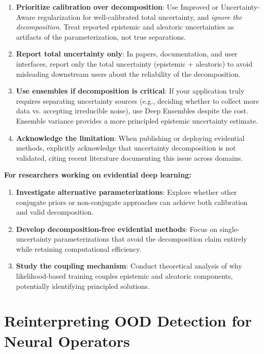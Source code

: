 \begin{enumerate}
\item \textbf{Prioritize calibration over decomposition}: Use Improved or Uncertainty-Aware regularization for well-calibrated total uncertainty, and \textit{ignore the decomposition}. Treat reported epistemic and aleatoric uncertainties as artifacts of the parameterization, not true separations.

\item \textbf{Report total uncertainty only}: In papers, documentation, and user interfaces, report only the total uncertainty (epistemic + aleatoric) to avoid misleading downstream users about the reliability of the decomposition.

\item \textbf{Use ensembles if decomposition is critical}: If your application truly requires separating uncertainty sources (e.g., deciding whether to collect more data vs. accepting irreducible noise), use Deep Ensembles despite the cost. Ensemble variance provides a more principled epistemic uncertainty estimate.

\item \textbf{Acknowledge the limitation}: When publishing or deploying evidential methods, explicitly acknowledge that uncertainty decomposition is not validated, citing recent literature documenting this issue across domains.
\end{enumerate}

\textbf{For researchers working on evidential deep learning:}

\begin{enumerate}
\item \textbf{Investigate alternative parameterizations}: Explore whether other conjugate priors or non-conjugate approaches can achieve both calibration and valid decomposition.

\item \textbf{Develop decomposition-free evidential methods}: Focus on single-uncertainty parameterizations that avoid the decomposition claim entirely while retaining computational efficiency.

\item \textbf{Study the coupling mechanism}: Conduct theoretical analysis of why likelihood-based training couples epistemic and aleatoric components, potentially identifying principled solutions.
\end{enumerate}

\section{Reinterpreting OOD Detection for Neural Operators}

